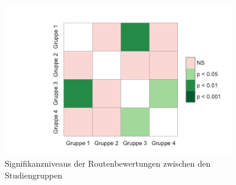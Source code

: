 \newpage

\begin{figure}[htb!]
    \centering
    \includegraphics[width=0.9\textwidth]{contents/06_model_evaluation/02_evaluation/res/rating_result_significance.pdf}
    \caption{Signifikanzniveaus der Routenbewertungen zwischen den Studiengruppen}
\end{figure}

\newpage


